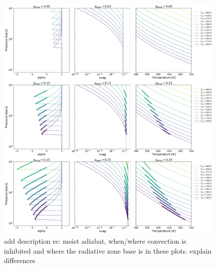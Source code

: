 \documentclass[11pt]{ucscthesisbs}
\begin{document}
\begin{figure}[ht!]
 \centerline{
  \includegraphics[width=7.0in]{figures/convection_inhibited_2.png}
 }
\caption[Inhibition of convection on Uranus]
{add description re: moist adiabat, when/where convection is inhibited and where the radiative zone base is in these plots. explain differences}
\label{fig:convection_inhibited}
\end{figure}
\end{document}
